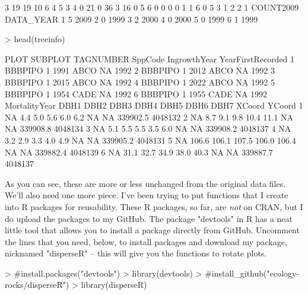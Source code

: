 \documentclass{article}
\begin{document}
\begin{Schunk}
\begin{Soutput}
3        19        19        10         6         4         5         3
4         0        21         0        36         3        16         0
5         6         0         0         0         0         1         1
6         0         5         3         1         2         2         1
  COUNT2009 DATA_YEAR
1         5      2009
2         0      1999
3         2      2000
4         0      2000
5         0      1999
6         1      1999
\end{Soutput}
\begin{Sinput}
> head(treeinfo)
\end{Sinput}
\begin{Soutput}
     PLOT SUBPLOT TAGNUMBER SppCode IngrowthYear YearFirstRecorded
1 BBBPIPO       1      1991    ABCO           NA              1992
2 BBBPIPO       1      2012    ABCO           NA              1992
3 BBBPIPO       1      2015    ABCO           NA              1992
4 BBBPIPO       1      2022    ABCO           NA              1992
5 BBBPIPO       1      1954    CADE           NA              1992
6 BBBPIPO       1      1955    CADE           NA              1992
  MortalityYear  DBH1  DBH2  DBH3  DBH4  DBH5 DBH6 DBH7   XCoord  YCoord
1            NA   4.4   5.0   5.6   6.0   6.2   NA   NA 339902.5 4048132
2            NA   8.7   9.1   9.8  10.4  11.1   NA   NA 339908.8 4048134
3            NA   5.1   5.5   5.5   3.5   6.0   NA   NA 339908.2 4048137
4            NA   3.2   2.9   3.3   4.0   4.9   NA   NA 339905.2 4048131
5            NA 106.6 106.1 107.5 106.0 106.4   NA   NA 339882.4 4048139
6            NA  31.1  32.7  34.9  38.0  40.3   NA   NA 339887.7 4048137
\end{Soutput}
\end{Schunk}

As you can see, these are more or less unchanged from the original data files. We'll also need one more piece. I've been trying to put functions that I create into R packages for reusability. These R packages, so far, are \textit{not} on CRAN, but I do upload the packages to my GitHub. The package "devtools" in R has a neat little tool that allows you to install a package directly from GitHub. Uncomment the lines that you need, below, to install packages and download my package, nicknamed "disperseR" -- this will give you the functions to rotate plots.

\begin{Schunk}
\begin{Sinput}
> #install.packages("devtools")
> library(devtools)
> #install_github("ecology-rocks/disperseR")
> library(disperseR)
\end{Sinput}
\end{Schunk}
\end{document}

